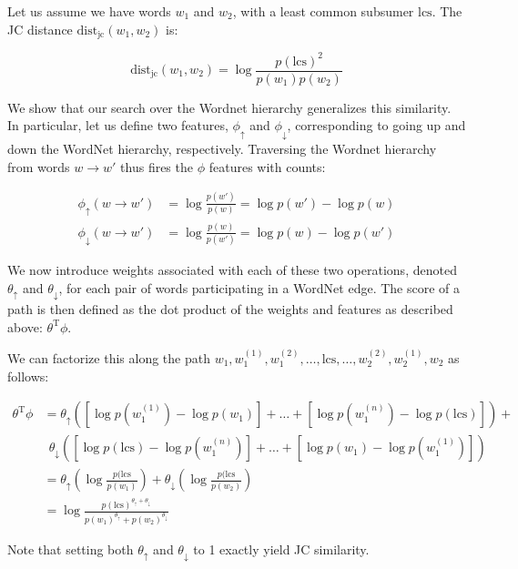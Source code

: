 
Let us assume we have words $w_1$ and $w_2$, with a least common subsumer $\textrm{lcs}$.
The JC distance $\textrm{dist}_{\textrm{jc}}(w_1, w_2)$ is:

\begin{equation}
\textrm{dist}_{\textrm{jc}}(w_1, w_2)
  = \log\frac{p(\textrm{lcs})^2}{p(w_1)p(w_2)}
\end{equation}

We show that our search over the Wordnet hierarchy generalizes this similarity.
In particular, let us define two features, $\phi_\uparrow$ and $\phi_\downarrow$,
  corresponding to going up and down the WordNet hierarchy, respectively.
Traversing the Wordnet hierarchy from words $w \rightarrow w'$ thus fires the $\phi$
  features with counts:

\begin{align}
  \phi_\uparrow(w \rightarrow w')
    &= \log\frac{p(w')}{p(w)} = \log p(w') - \log p(w) \\
  \phi_\downarrow(w \rightarrow w')
    &= \log\frac{p(w)}{p(w')} = \log p(w) - \log p(w') 
\end{align}

We now introduce weights associated with each of these two operations, denoted
  $\theta_\uparrow$ and $\theta_\downarrow$, for each pair of words participating
  in a WordNet edge.
The score of a path is then defined as the dot product of the weights and features
  as described above: $\theta^{\textrm{T}}\phi$.

We can factorize this along the path
  $w_1, w_1^{(1)}, w_1^{(2)}, \dots, \textrm{lcs}, \dots, w_2^{(2)},  w_2^{(1)}, w_2$
  as follows:

\begin{align*}
\theta^{\textrm{T}}\phi
  &= \theta_\uparrow \left( 
    \left[\log p(w_1^{(1)}) - \log p(w_1)\right] +
    \dots +
    \left[\log p(w_1^{(n)}) - \log p(\textrm{lcs})\right]
    \right) + \\
  &~~ \theta_\downarrow \left( 
    \left[\log p(\textrm{lcs}) - \log p(w_1^{(n)}) \right] +
    \dots +
    \left[\log p(w_1) - \log p(w_1^{(1)})\right]
    \right) \\
  &= \theta_\uparrow \left( \log \frac{p(\textrm{lcs}}{p(w_1)} \right) +
     \theta_\downarrow \left( \log \frac{p(\textrm{lcs}}{p(w_2)} \right) \\
  &= \log \frac{ p(\textrm{lcs})^{\theta_\uparrow + \theta_\downarrow} }
               { p(w_1)^{\theta_\uparrow} + p(w_2)^{\theta_\downarrow} }
\end{align*}

Note that setting both $\theta_\uparrow$ and $\theta_\downarrow$ to 1 exactly
  yield JC similarity.
